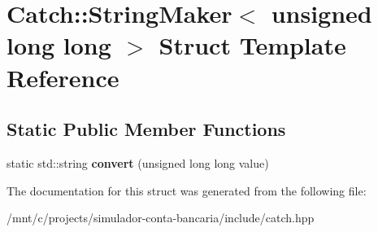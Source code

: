 \hypertarget{structCatch_1_1StringMaker_3_01unsigned_01long_01long_01_4}{}\section{Catch\+:\+:String\+Maker$<$ unsigned long long $>$ Struct Template Reference}
\label{structCatch_1_1StringMaker_3_01unsigned_01long_01long_01_4}
\subsection*{Static Public Member Functions}
\begin{DoxyCompactItemize}
\item 
\mbox{\label{structCatch_1_1StringMaker_3_01unsigned_01long_01long_01_4_a6a8708af4fc8df3f52d7eab779b6bc6f}} 
static std\+::string {\bfseries convert} (unsigned long long value)
\end{DoxyCompactItemize}


The documentation for this struct was generated from the following file\+:\begin{DoxyCompactItemize}
\item 
/mnt/c/projects/simulador-\/conta-\/bancaria/include/catch.\+hpp\end{DoxyCompactItemize}
